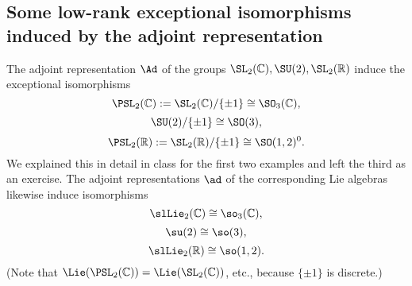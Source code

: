 \documentclass[reqno]{amsart} 
\begin{document}
\subsection{Some low-rank exceptional isomorphisms induced by the adjoint representation\label{sec:low-rank-exceptional-isomorphisms}}
\label{sec:orgcb7a112}
The adjoint representation $\Ad$
of the groups $\SL_2(\mathbb{C}), \SU(2), \SL_2(\mathbb{R})$
induce the exceptional isomorphisms
\begin{equation*}
  \PSL_2(\mathbb{C}) := \SL_2(\mathbb{C}) / \{\pm 1\}
  \cong \SO_3(\mathbb{C}),
\end{equation*}
\begin{equation*}
  \SU(2) / \{\pm 1\}
  \cong \SO(3),
\end{equation*}
\begin{equation*}
  \PSL_2(\mathbb{R}) := \SL_2(\mathbb{R}) / \{\pm 1\}
  \cong \SO(1,2)^0.
\end{equation*}
We explained this in detail in class for the first two examples
and left the third as an exercise.
The adjoint representations $\ad$ of the corresponding Lie
algebras
likewise induce
isomorphisms
\begin{equation*}
  \slLie_2(\mathbb{C}) \cong \so_3(\mathbb{C}),
\end{equation*}
\begin{equation*}
  \su(2) \cong \so(3),
\end{equation*}
\begin{equation*}
  \slLie_2(\mathbb{R}) \cong \so(1,2).
\end{equation*}
(Note that $\Lie(\PSL_2(\mathbb{C})) = \Lie(\SL_2(\mathbb{C}))$,
etc.,
because $\{\pm 1\}$ is discrete.)
\end{document}
